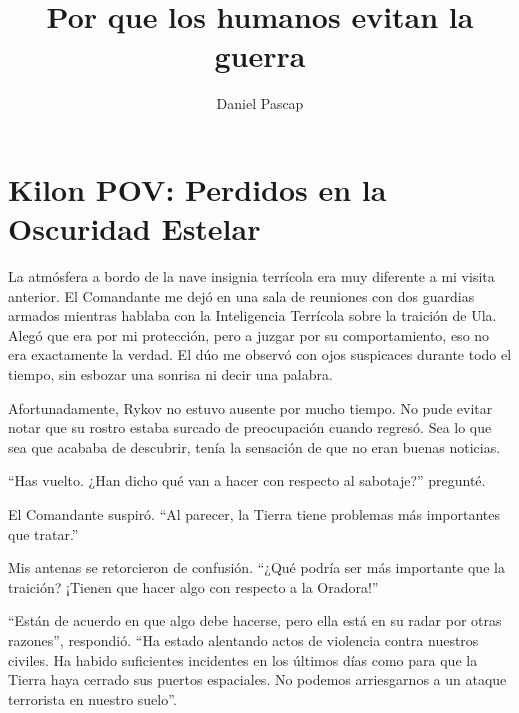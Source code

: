 \documentclass[spanish,12pt,a4paper,oneside,titlepage]{book}
\title{Por que los humanos evitan la guerra}
\author{Daniel Pascap}
\begin{document}
    \maketitle
    \tableofcontents

    
    
    
    
    
    
    




    \chapter{Kilon POV: Perdidos en la Oscuridad Estelar}

    La atmósfera a bordo de la nave insignia terrícola era muy diferente a mi visita anterior. El Comandante me dejó en una sala de reuniones con dos guardias armados mientras hablaba con la Inteligencia Terrícola sobre la traición de Ula. Alegó que era por mi protección, pero a juzgar por su comportamiento, eso no era exactamente la verdad. El dúo me observó con ojos suspicaces durante todo el tiempo, sin esbozar una sonrisa ni decir una palabra.

    Afortunadamente, Rykov no estuvo ausente por mucho tiempo. No pude evitar notar que su rostro estaba surcado de preocupación cuando regresó. Sea lo que sea que acababa de descubrir, tenía la sensación de que no eran buenas noticias.

    ``Has vuelto. ¿Han dicho qué van a hacer con respecto al sabotaje?'' pregunté.

    El Comandante suspiró. ``Al parecer, la Tierra tiene problemas más importantes que tratar.''

    Mis antenas se retorcieron de confusión. ``¿Qué podría ser más importante que la traición? ¡Tienen que hacer algo con respecto a la Oradora!''

    ``Están de acuerdo en que algo debe hacerse, pero ella está en su radar por otras razones'', respondió. ``Ha estado alentando actos de violencia contra nuestros civiles. Ha habido suficientes incidentes en los últimos días como para que la Tierra haya cerrado sus puertos espaciales. No podemos arriesgarnos a un ataque terrorista en nuestro suelo''.
\end{document}
